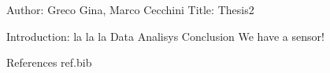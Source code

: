 Author: Greco Gina, Marco Cecchini
Title: Thesis2

Introduction: la la la
Data
Analisys
Conclusion We have a sensor!


References
ref.bib
